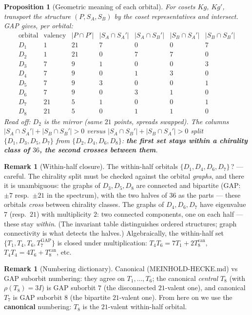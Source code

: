\documentclass[11pt]{article}
\newtheorem{proposition}[theorem]{Proposition}
\theoremstyle{definition}
\newtheorem{remark}[theorem]{Remark}
\begin{document}
\begin{proposition}[Geometric meaning of each orbital]\label{prop:invariants}
For cosets $Kg$, $Kg'$, transport the structure $(P, S_A, S_B)$ by the coset
representatives and intersect. GAP gives, per orbital:
\[
\begin{array}{c|c|c|cccc}
\text{orbital} & \text{valency} & |P\cap P'| & |S_A\cap S_A'| &
|S_A\cap S_B'| & |S_B\cap S_A'| & |S_B\cap S_B'|\\
\hline
D_1 & 1 & 21 & 7 & 0 & 0 & 7\\
D_2 & 1 & 21 & 0 & 7 & 7 & 0\\
D_3 & 7 & 9 & 1 & 0 & 0 & 3\\
D_4 & 7 & 9 & 0 & 1 & 3 & 0\\
D_5 & 7 & 9 & 3 & 0 & 0 & 1\\
D_6 & 7 & 9 & 0 & 3 & 1 & 0\\
D_7 & 21 & 5 & 1 & 0 & 0 & 1\\
D_8 & 21 & 5 & 0 & 1 & 1 & 0
\end{array}
\]
Read off: $D_2$ is the mirror (same $21$ points, spreads swapped). The
columns $|S_A\cap S_A'| + |S_B \cap S_B'| > 0$ versus
$|S_A\cap S_B'| + |S_B\cap S_A'| > 0$ split
$\{D_1,D_3,D_5,D_7\}$ from $\{D_2,D_4,D_6,D_8\}$: \textbf{the first set
stays within a chirality class of $36$, the second crosses between them}.
\end{proposition}

\begin{remark}[Within-half closure]
The within-half orbitals $\{D_1, D_4, D_6, D_7\}$\,? --- careful. The
chirality split must be checked against the orbital \emph{graphs}, and there
it is unambiguous: the graphs of $D_3, D_5, D_8$ are connected and bipartite
(GAP: $\pm7$ resp.\ $\pm21$ in the spectrum), with the two halves of $36$ as
the parts --- these orbitals \emph{cross} between chirality classes. The
graphs of $D_4, D_6, D_7$ have eigenvalue $7$ (resp.\ $21$) with
multiplicity $2$: two connected components, one on each half --- these stay
\emph{within}. (The invariant table distinguishes ordered structures; graph
connectivity is what detects the halves.) Algebraically, the within-half
set $\{T_1, T_4, T_6, T_7^{\mathrm{GAP}}\}$ is closed under multiplication:
$T_4T_6 = 7T_1 + 2T_8^{\mathrm{can}}$, $T_4T_4 = 4T_6 + T_8^{\mathrm{can}}$, etc.
\end{remark}

\begin{remark}[Numbering dictionary]\label{rem:dictionary}
Canonical (MEINHOLD-HECKE.md) vs GAP suborbit numbering: they agree on
$T_1,\dots,T_6$; the canonical \emph{central} $T_8$ (with $\rho(T_8)=3I$) is
GAP suborbit $7$ (the disconnected $21$-valent one), and canonical $T_7$ is
GAP suborbit $8$ (the bipartite $21$-valent one). From here on we use the
\textbf{canonical} numbering: $T_8$ is the $21$-valent within-half orbital.
\end{remark}
\end{document}
